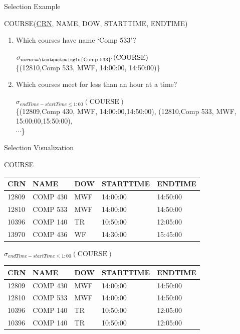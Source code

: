 \documentclass[aspectratio=169]{beamer}
\begin{document}
\begin{frame}{Selection Example}

COURSE(\underline{CRN}, NAME, DOW, STARTTIME, ENDTIME)

\begin{enumerate}
\item Which courses have name `Comp 533'?


$\sigma_{name = \textquotesingle{\textrm{Comp 533}}'}(\textrm{COURSE})$\\

\{(12810,Comp 533, MWF, 14:00:00, 14:50:00)\}
\vspace{1em}
\item Which courses meet for less than an hour at a time?

$\sigma_{endTime - startTime \le 1:00}(\textrm{COURSE})$\\

\{(12809,Comp 430, MWF, 14:00:00,14:50:00),
 (12810,Comp 533, MWF, 15:00:00,15:50:00),\\
$\dotsi$\}
\end{enumerate}
\end{frame}


\begin{frame}{Selection Visualization}

COURSE\\
\begin{tabular}{|p{1.5cm}|l|l|p{2cm}|p{2cm}|}  \hline
\textrm{CRN} & \textrm{NAME} & \textrm{DOW}& \textrm{STARTTIME}& \textrm{ENDTIME}\\ \hline
 12809 & COMP 430 & MWF & 14:00:00 & 14:50:00 \\ \hline
 12810 & COMP 533 & MWF & 14:00:00 & 14:50:00 \\ \hline
 10396 & COMP 140 & TR & 10:50:00 & 12:05:00 \\ \hline
 13970 & COMP 436 & WF & 14:30:00 & 15:45:00 \\ \hline
\end{tabular}

\vspace{1em}
$\sigma_{endTime - startTime \le 1:00}(\textrm{COURSE})$\\
\vspace{1em}

\begin{tabular}{|p{1.5cm}|l|l|p{2cm}|p{2cm}|}  \hline
\textrm{CRN} & \textrm{NAME} & \textrm{DOW}& \textrm{STARTTIME}& \textrm{ENDTIME}\\ \hline
 12809 & COMP 430 & MWF & 14:00:00 & 14:50:00 \\ \hline
 12810 & COMP 533 & MWF & 14:00:00 & 14:50:00 \\ \hline
 \cellcolor{black}10396 &\cellcolor{black} COMP 140 & \cellcolor{black}TR & \cellcolor{black}10:50:00 & \cellcolor{black}12:05:00 \\ \hline
 \cellcolor{black}10396 &\cellcolor{black} COMP 140 & \cellcolor{black}TR & \cellcolor{black}10:50:00 & \cellcolor{black}12:05:00 \\ \hline
\end{tabular}

\end{frame}
\end{document}
